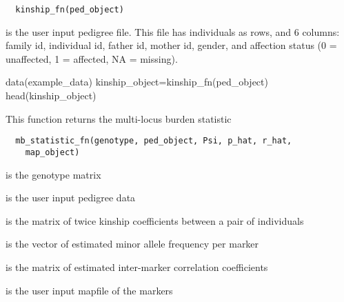 \documentclass[a4paper]{book}
\begin{document}
%
\begin{Usage}
\begin{verbatim}
  kinship_fn(ped_object)
\end{verbatim}
\end{Usage}
%
\begin{Arguments}
\begin{ldescription}
\item[\code{ped\_object}] is the user input pedigree file. This
file has individuals as rows, and 6 columns: family id,
individual id, father id, mother id, gender, and
affection status (0 = unaffected, 1 = affected, NA =
missing).
\end{ldescription}
\end{Arguments}
%
\begin{Examples}
\begin{ExampleCode}
data(example_data)
 kinship_object=kinship_fn(ped_object)
head(kinship_object)
\end{ExampleCode}
\end{Examples}
%
\begin{Description}\relax
This function returns the multi-locus burden statistic
\end{Description}
%
\begin{Usage}
\begin{verbatim}
  mb_statistic_fn(genotype, ped_object, Psi, p_hat, r_hat,
    map_object)
\end{verbatim}
\end{Usage}
%
\begin{Arguments}
\begin{ldescription}
\item[\code{genotype}] is the genotype matrix

\item[\code{ped\_object}] is the user input pedigree data

\item[\code{Psi}] is the matrix of twice kinship coefficients
between a pair of individuals

\item[\code{p\_hat}] is the vector of estimated minor allele
frequency per marker

\item[\code{r\_hat}] is the matrix of estimated inter-marker
correlation coefficients

\item[\code{map\_object}] is the user input mapfile of the
markers
\end{ldescription}
\end{Arguments}
\end{document}
